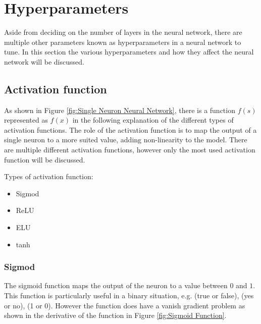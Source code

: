 \documentclass{tum-book}
\begin{document}
    \newpage\section{Hyperparameters}\label{section:hyperparameters}
    Aside from deciding on the number of layers in the neural network, there are multiple other parameters known as hyperparameters in a neural network to tune. In this section the various hyperparameters and how they affect the neural network will be discussed.

        \subsection{Activation function}
        As shown in Figure \ref{fig:Single Neuron Neural Network}, there is a function $f(s)$ represented as $f(x)$ in the following explanation of the different types of activation functions. The role of the activation function is to map the output of a single neuron to a more suited value, adding non-linearity to the model. There are multiple different activation functions, however only the most used activation function will be discussed. 
        
            \bigskip\noindent 
            Types of activation function:
            \begin{itemize}
                \item Sigmod
                \item ReLU
                \item ELU
                \item tanh
            \end{itemize}

        \subsubsection{Sigmod}
        The sigmoid function maps the output of the neuron to a value between $0$ and $1$. This function is particularly useful in a binary situation, e.g. (true or false), (yes or no), (1 or 0). However the function does have a vanish gradient problem as shown in the derivative of the function in Figure \ref{fig:Sigmoid Function}. 
        
\end{document}
